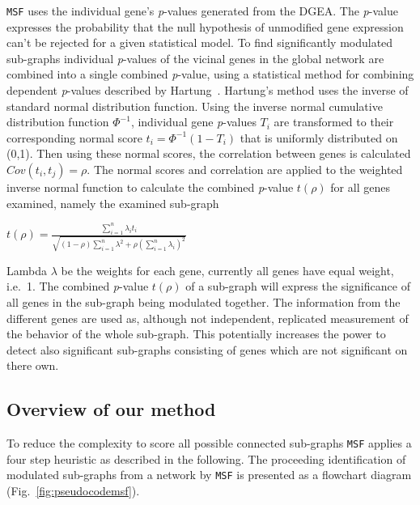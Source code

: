 \documentclass[10pt,a4paper,twocolumn]{article}
\begin{document}
	\texttt{MSF} uses the individual gene's \textit{p}-values
        generated from the DGEA. The \textit{p}-value expresses the
        probability that the null hypothesis of unmodified gene
        expression can't be rejected for a given statistical model. To
        find significantly modulated sub-graphs individual
        \textit{p}-values of the vicinal genes in the global network
        are combined into a single combined \textit{p}-value, using a
        statistical method for combining dependent \textit{p}-values
        described by Hartung~\cite{Hartung}. Hartung's method uses the
        inverse of standard normal distribution function. Using the
        inverse normal cumulative distribution function $\Phi^{-1}$,
        individual gene \textit{p}-values $T_{i}$ are transformed to
        their corresponding normal score $t_{i}=\Phi^{-1}(1-T_{i})$
        that is uniformly distributed on (0,1). Then using these
        normal scores, the correlation between genes is calculated
        $Cov(t_{i},t_{j})=\rho$. The normal scores and correlation are
        applied to the weighted inverse normal function to calculate
        the combined \textit{p}-value $t(\rho)$ for all genes
        examined, namely the examined sub-graph
	\newline
	\begin{center}
		$t(\rho)=\frac{\sum_{i=1}^{n}\lambda_i t_{i} }{\sqrt{(1-\rho) \sum_{i=1}^{n} \lambda^{2}+\rho(\sum_{i=1}^{n} \lambda_i)^{2}}}$
	\end{center}
	
	Lambda $\lambda$ be the weights for each gene, currently all
        genes have equal weight, i.e.~1. The combined \textit{p}-value
        $t(\rho)$ of a sub-graph will express the significance of all
        genes in the sub-graph being modulated together. The
        information from the different genes are used as, although not
        independent, replicated measurement of the behavior of the
        whole sub-graph. This potentially increases the power to
        detect also significant sub-graphs consisting of genes which
        are not significant on there own.

	
	\subsection*{Overview of our method}
	
	To reduce the complexity to score all possible connected sub-graphs
	\texttt{MSF} applies a four step heuristic as described in the
	following. The proceeding identification of modulated sub-graphs from a
	network by \texttt{MSF} is presented as a flowchart diagram
	(Fig.~\ref{fig:pseudocodemsf}). \newline
	
\end{document}
